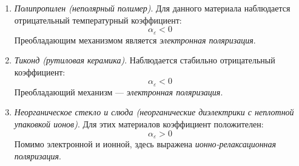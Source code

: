 \begin{enumerate}
    \item \textit{Полипропилен (неполярный полимер)}.
    Для данного материала наблюдается отрицательный температурный коэффициент:
    \begin{equation}
        \alpha_\varepsilon < 0
    \end{equation}
    Преобладающим механизмом является \textit{электронная поляризация}.%

    \item \textit{Тиконд (рутиловая керамика)}.
    Наблюдается стабильно отрицательный коэффициент:
    \begin{equation}
        \alpha_\varepsilon < 0
    \end{equation}
    Преобладающий механизм --- \textit{электронная поляризация}.

    \item \textit{Неорганическое стекло и слюда (неорганические диэлектрики с неплотной упаковкой ионов)}.
    Для этих материалов коэффициент положителен:
    \begin{equation}
        \alpha_\varepsilon > 0
    \end{equation}
    Помимо электронной и ионной, здесь выражена \textit{ионно-релаксационная поляризация}.%


\end{enumerate}
